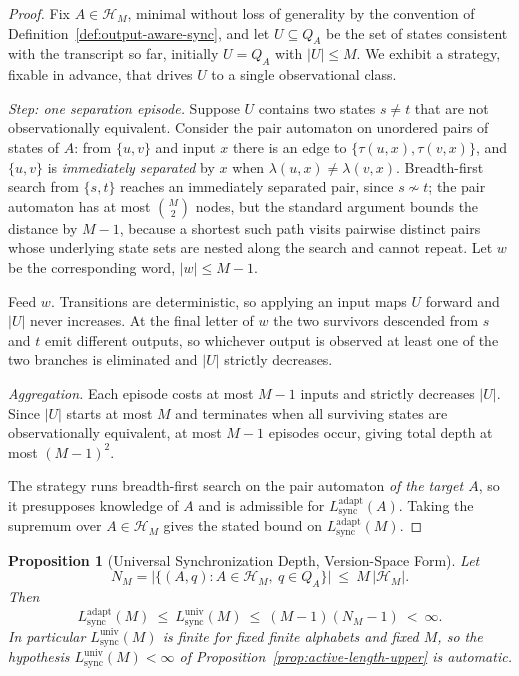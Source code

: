 \documentclass[12pt]{article}
\newtheorem{proposition}[theorem]{Proposition}
\theoremstyle{definition}
\newcommand{\Lsync}{L_{\mathrm{sync}}^{\mathrm{adapt}}}
\newcommand{\Lsyncu}{L_{\mathrm{sync}}^{\mathrm{univ}}}
\begin{document}
\begin{proof}
Fix $A\in\mathcal H_M$, minimal without loss of generality by the convention of
Definition~\ref{def:output-aware-sync}, and let $U\subseteq Q_A$ be the set of
states consistent with the transcript so far, initially $U=Q_A$ with
$|U|\le M$.  We exhibit a strategy, fixable in advance, that drives $U$ to a
single observational class.

\emph{Step: one separation episode.}  Suppose $U$ contains two states $s\ne t$
that are not observationally equivalent.  Consider the pair automaton on
unordered pairs of states of $A$: from $\{u,v\}$ and input $x$ there is an edge
to $\{\tau(u,x),\tau(v,x)\}$, and $\{u,v\}$ is \emph{immediately separated} by
$x$ when $\lambda(u,x)\ne\lambda(v,x)$.  Breadth-first search from $\{s,t\}$
reaches an immediately separated pair, since $s\not\sim t$; the pair automaton
has at most $\binom{M}{2}$ nodes, but the standard argument bounds the distance
by $M-1$, because a shortest such path visits pairwise distinct pairs whose
underlying state sets are nested along the search and cannot repeat.  Let $w$
be the corresponding word, $|w|\le M-1$.

Feed $w$.  Transitions are deterministic, so applying an input maps $U$ forward
and $|U|$ never increases.  At the final letter of $w$ the two survivors
descended from $s$ and $t$ emit different outputs, so whichever output is
observed at least one of the two branches is eliminated and $|U|$ strictly
decreases.

\emph{Aggregation.}  Each episode costs at most $M-1$ inputs and strictly
decreases $|U|$.  Since $|U|$ starts at most $M$ and terminates when all
surviving states are observationally equivalent, at most $M-1$ episodes occur,
giving total depth at most $(M-1)^2$.

The strategy runs breadth-first search on the pair automaton \emph{of the
target $A$}, so it presupposes knowledge of $A$ and is admissible for
$\Lsync(A)$.  Taking the supremum over $A\in\mathcal H_M$ gives the stated
bound on $\Lsync(M)$.
\end{proof}

\begin{proposition}[Universal Synchronization Depth, Version-Space Form]
\label{prop:lsyncu-version-space}
Let
\[
N_M=\bigl|\{(A,q):A\in\mathcal H_M,\ q\in Q_A\}\bigr|\ \le\ M\,|\mathcal H_M| .
\]
Then
\[
\Lsync(M)\ \le\ \Lsyncu(M)\ \le\ (M-1)(N_M-1)\ <\ \infty .
\]
In particular $\Lsyncu(M)$ is finite for fixed finite alphabets and fixed $M$,
so the hypothesis $\Lsyncu(M)<\infty$ of
Proposition~\ref{prop:active-length-upper} is automatic.
\end{proposition}
\end{document}
